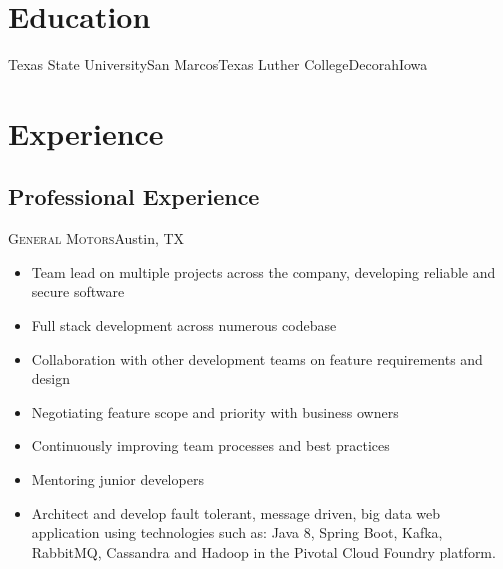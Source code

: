 \documentclass[11pt,letterpaper,sans]{moderncv}
\begin{document}

\section{Education}
           {Texas State University}{San Marcos}{Texas}{}
           {Luther College}{Decorah}{Iowa}{}



\section{Experience}

  \subsection{Professional Experience}

     {\textsc{General Motors}}{Austin, TX}{}
     {\begin{itemize}
         \item Team lead on multiple projects across the company,
               developing reliable and secure software
         \item Full stack development across numerous codebase
         \item Collaboration with other development teams on feature
               requirements and design
         \item Negotiating feature scope and priority with business
               owners
         \item Continuously improving team processes and best practices
         \item Mentoring junior developers
         \item Architect and develop fault tolerant, message driven,
               big data web application using technologies such as: Java
               8, Spring Boot, Kafka, RabbitMQ, Cassandra and Hadoop in
               the Pivotal Cloud Foundry platform.
     \end{itemize}}
\end{document}

